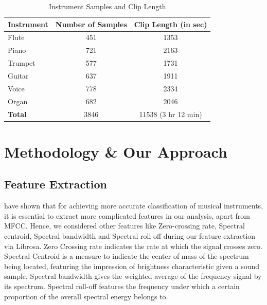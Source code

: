 \documentclass{article}
\begin{document}
\begin{table}[h!]
	\begin{tabular}{@{}lcc@{}}
		\textbf{Instrument} & \textbf{Number of Samples} & \multicolumn{1}{l}{\textbf{Clip Length (in sec)}}           \\\midrule
		Flute               & 451                        & 1353                                                        \\
		Piano               & 721                        & 2163                                                        \\
		Trumpet             & 577                        & 1731                                                        \\
		Guitar              & 637                        & 1911                                                        \\
		Voice               & 778                        & 2334                                                        \\
		Organ               & 682                        & 2046                                                        \\
		\textbf{Total}               & 3846                       & 11538 (3 hr 12 min) 
	\end{tabular}
\vspace{0.1in}
\caption{Instrument Samples and Clip Length}
	\label{tab:ic}
\end{table}



\section{Methodology \& Our Approach}

\subsection{Feature Extraction}
\citet{deng2008study} have shown that for achieving more accurate classification of musical instruments, it is essential to extract more complicated features in our analysis, apart from MFCC. Hence, we considered other features like Zero-crossing rate, Spectral centroid, Spectral bandwidth and Spectral roll-off during our feature extraction via Librosa. Zero Crossing rate indicates the rate at which the signal crosses zero. Spectral Centroid is a measure to indicate the center of mass of the spectrum being located, featuring the impression of brightness characteristic given a sound sample. Spectral bandwidth gives the weighted average of the frequency signal by its spectrum. Spectral roll-off features the frequency under which a certain proportion of the overall spectral energy belongs to.
\end{document}
